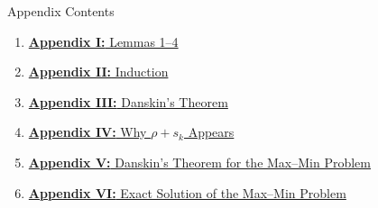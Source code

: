 \documentclass[handout,compress,9pt]{beamer}
\begin{document}
\begin{frame}{Appendix Contents}
\hypertarget{appendix:contents}{}
\small
\begin{enumerate}
  \setlength{\itemsep}{0.22cm}
  \item \hyperlink{appendix:lemmas}{\textbf{Appendix I:} Lemmas 1--4}
  \item \hyperlink{appendix:bootstrap-joint-claim}{\textbf{Appendix II:} Induction}
  \item \hyperlink{appendix:danskin-theorem}{\textbf{Appendix III:} Danskin's Theorem}
  \item \hyperlink{appendix:why-rho-plus-sk}{\textbf{Appendix IV:} Why $\rho+s_k$ Appears}
  \item \hyperlink{appendix:danskin-maxmin}{\textbf{Appendix V:} Danskin's Theorem for the Max--Min Problem}
  \item \hyperlink{appendix:exact-maxmin}{\textbf{Appendix VI:} Exact Solution of the Max--Min Problem}
\end{enumerate}
\end{frame}
\end{document}
